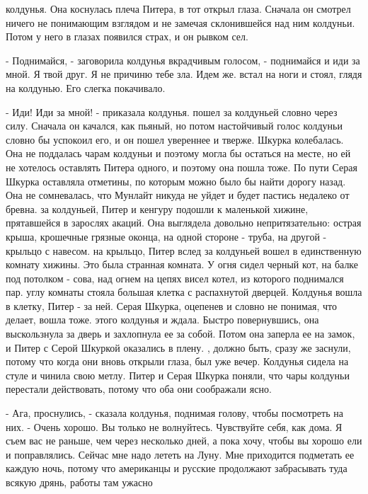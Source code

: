 колдунья. Она коснулась плеча Питера, в тот открыл глаза. Сначала он 
смотрел ничего не понимающим взглядом и не замечая склонившейся над 
ним колдуньи. Потом у него в глазах появился страх, и он рывком сел.
\par- Поднимайся, - заговорила колдунья вкрадчивым голосом, - 
поднимайся и иди за мной. Я твой друг. Я не причиню тебе зла. Идем же.
 встал на ноги и стоял, глядя на колдунью. Его слегка 
покачивало.
\par- Иди! Иди за мной! - приказала колдунья.
 пошел за колдуньей словно через силу. Сначала он качался, 
как пьяный, но потом настойчивый голос колдуньи словно бы успокоил 
его, и он пошел увереннее и тверже.
 Шкурка колебалась. Она не поддалась чарам колдуньи и поэтому 
могла бы остаться на месте, но ей не хотелось оставлять Питера одного, 
и поэтому она пошла тоже. По пути Серая Шкурка оставляла отметины, по 
которым можно было бы найти дорогу назад. Она не сомневалась, что 
Мунлайт никуда не уйдет и будет пастись недалеко от бревна.
 за колдуньей, Питер и кенгуру подошли к маленькой хижине, 
прятавшейся в зарослях акаций. Она выглядела довольно непритязательно: 
острая крыша, крошечные грязные оконца, на одной стороне - труба, на 
другой - крыльцо с навесом.
 на крыльцо, Питер вслед за колдуньей вошел в 
единственную комнату хижины. Это была странная комната. У огня сидел 
черный кот, на балке под потолком - сова, над огнем на цепях висел 
котел, из которого поднимался пар.
 углу комнаты стояла большая клетка с распахнутой дверцей. 
Колдунья вошла в клетку, Питер - за ней. Серая Шкурка, оцепенев и 
словно не понимая, что делает, вошла тоже.
 этого колдунья и ждала. Быстро повернувшись, она 
выскользнула за дверь и захлопнула ее за собой. Потом она заперла ее 
на замок, и Питер с Серой Шкуркой оказались в плену.
, должно быть, сразу же заснули, потому что когда они вновь 
открыли глаза, был уже вечер. Колдунья сидела на стуле и чинила свою 
метлу. Питер и Серая Шкурка поняли, что чары колдуньи перестали 
действовать, потому что оба они соображали ясно.
\par- Ага, проснулись, - сказала колдунья, поднимая голову, чтобы 
посмотреть на них. - Очень хорошо. Вы только не волнуйтесь. Чувствуйте 
себя, как дома. Я съем вас не раньше, чем через несколько дней, а пока 
хочу, чтобы вы хорошо ели и поправлялись. Сейчас мне надо лететь на 
Луну. Мне приходится подметать ее каждую ночь, потому что американцы и 
русские продолжают забрасывать туда всякую дрянь, работы там ужасно 
